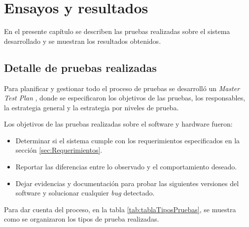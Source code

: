 
\chapter{Ensayos y resultados} %

\label{Chapter4} %

En el presente capítulo se describen las pruebas realizadas sobre el sistema desarrollado y se muestran los resultados obtenidos.



\section{Detalle de pruebas realizadas}

Para planificar y gestionar todo el proceso de pruebas se desarrolló un \textit{Master Test Plan} \citep{WEBSITE:MasterTestPlan}, donde se especificaron los objetivos de las pruebas, los responsables, la estrategia general y la estrategia por niveles de prueba.   

Los objetivos de las pruebas realizadas sobre el software y hardware fueron:

\begin{itemize}
\item Determinar si el sistema cumple con los requerimientos especificados en la sección \ref{sec:Requerimientos}.
\item Reportar las diferencias entre lo observado y el comportamiento deseado.
\item Dejar evidencias y documentación para probar las siguientes versiones del software y solucionar cualquier \textit{bug} detectado.
\end{itemize}

Para dar cuenta del proceso, en la tabla \ref{tab:tablaTiposPruebas}, se muestra como se organizaron los tipos de prueba realizadas.

